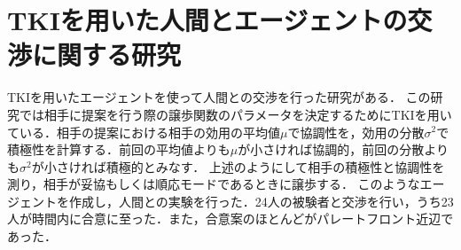 \section{TKIを用いた人間とエージェントの交渉に関する研究}
TKIを用いたエージェントを使って人間との交渉を行った研究がある\cite{tki-ha}．
この研究では相手に提案を行う際の譲歩関数のパラメータを決定するためにTKIを用いている．相手の提案における相手の効用の平均値$\mu$で協調性を，効用の分散$\sigma^2$で積極性を計算する．前回の平均値よりも$\mu$が小さければ協調的，前回の分散よりも$\sigma^2$が小さければ積極的とみなす．
上述のようにして相手の積極性と協調性を測り，相手が妥協もしくは順応モードであるときに譲歩する．
このようなエージェントを作成し，人間との実験を行った．24人の被験者と交渉を行い，うち23人が時間内に合意に至った．また，合意案のほとんどがパレートフロント近辺であった．

